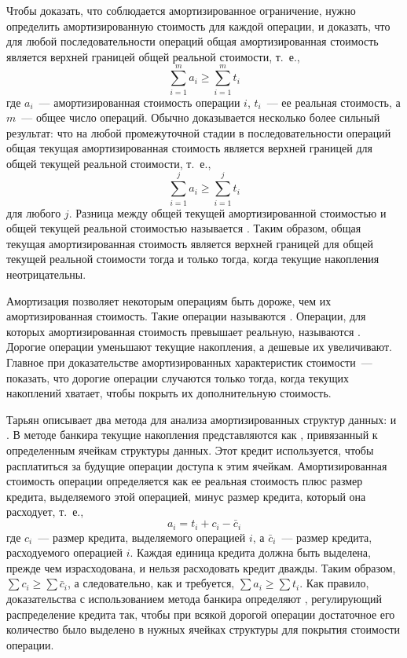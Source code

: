 Чтобы доказать, что соблюдается амортизированное ограничение, нужно
определить амортизированную стоимость для каждой операции, и доказать,
что для любой последовательности операций общая амортизированная
стоимость является верхней границей общей реальной стоимости, т.~е.,
$$
\sum_{i=1}^m a_i \ge \sum_{i=1}^m t_i
$$
где $a_i$~--- амортизированная стоимость операции $i$, $t_i$~--- ее
реальная стоимость, а $m$~--- общее число операций. Обычно
доказывается несколько более сильный результат: что на любой
промежуточной стадии в последовательности операций общая текущая
амортизированная стоимость является верхней границей для общей текущей
реальной стоимости, т.~е.,
$$
\sum_{i=1}^j a_i \ge \sum_{i=1}^j t_i
$$
для любого $j$. Разница между общей текущей амортизированной стоимостью
и общей текущей реальной стоимостью называется
. Таким образом, общая
текущая амортизированная стоимость является верхней границей для
общей текущей реальной стоимости тогда и только тогда, когда текущие
накопления неотрицательны.

Амортизация позволяет некоторым операциям быть дороже, чем их
амортизированная стоимость. Такие операции называются
. Операции, для которых амортизированная
стоимость превышает реальную, называются
. Дорогие операции уменьшают текущие накопления,
а дешевые их увеличивают. Главное при доказательстве
амортизированных характеристик стоимости~--- показать, что дорогие
операции случаются только тогда, когда текущих накоплений хватает,
чтобы покрыть их дополнительную стоимость.

Тарьян \cite{Tarjan1985} описывает два метода для анализа
амортизированных структур данных:  и . В методе банкира
текущие накопления представляются как ,
привязанный к определенным ячейкам структуры данных. Этот кредит
используется, чтобы расплатиться за будущие операции доступа к этим
ячейкам.  Амортизированная стоимость операции определяется как ее
реальная стоимость плюс размер кредита, выделяемого этой операцией,
минус размер кредита, который она расходует, т.~е.,
$$
a_i = t_i + c_i - \bar{c}_i
$$
где $c_i$~--- размер кредита, выделяемого операцией $i$, а $\bar{c}_i$~---
размер кредита, расходуемого операцией $i$. Каждая единица кредита
должна быть выделена, прежде чем израсходована, и нельзя расходовать
кредит дважды. Таким образом, $\sum c_i \ge \sum \bar{c}_i$, а
следовательно, как и требуется, $\sum a_i \ge \sum t_i$. Как правило,
доказательства с использованием метода банкира определяют
, регулирующий распределение
кредита так, чтобы при всякой дорогой операции достаточное его
количество было выделено в нужных ячейках структуры для покрытия
стоимости операции.

